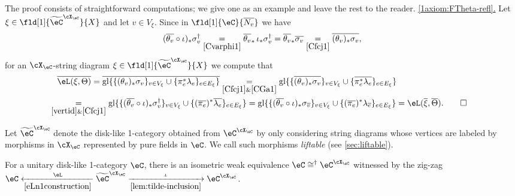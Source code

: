 \documentclass[12pt,reqno]{amsart}
\newcommand{\glu}{\mathrm{gl}}
\newcommand{\C}{\eC}
\newcommand{\tld}[1]{{\widetilde{#1}}}
\newcommand{\fcj}[1]{\overline{#1}}
\newcommand{\orev}{\overline}
\newcommand{\defn}[1]{\emph{#1}}
\newcommand{\itemstep}[1]{\smallskip\noindent\underline{#1}}
\begin{document}
\begin{pf}
The proof consists of straightforward computations; we give one as an example and leave the rest to the reader.
\itemstep{\ref{1axiom:FTheta-refl}.} Let $\xi\in\fld[1]{\tld\C^{\cX_\C}}{X}$ and let $v\in V_\xi$. Since in $\fld[1]{\C}{\orev{N_v}}$ we have
\begin{equation}\label{vertid}
(\orev{\theta_v}\circ\iota)_*\sigma_v^\dag \underset{\ref{Cvarphi1}}{=} \orev{\theta_v}_*\,\iota_*\sigma_v^\dag 
=
\orev{\theta_v}_*\fcj{\sigma_v} 
\underset{\ref{Cfcj1}}{=} 
\fcj{(\theta_v)_*\sigma_v},
\end{equation}
for an $\cX_\C$-string diagram $\xi\in\fld[1]{\tld\C^{\cX_\C}}{X}$ we compute that
\begin{align*}
&\fcj{\eL(\xi,\Theta)}
=
\fcj{\glu\{\{(\theta_v)_*\sigma_v\}_{v\in V_\xi}
\cup
\{\pi_e^*\lambda_e\}_{e\in E_\xi}\}}
\underset{\substack{\ref{Cfcj1}\&\ref{CGa1}}}{=}
\glu\{
\{\fcj{(\theta_v)_*\sigma_v}
\}_{v\in V_\xi}
\cup
\{\fcj{\pi_e^*\lambda_e}\}_{e\in E_\xi}
\}
\\
&\!\!\!\!\!\!\underset{\substack{\eqref{vertid}\&\ref{Cfcj1}}}{=}
\glu\{\{(\orev{\theta_v}\circ\iota)_*\sigma_v^\dag\}_{v\in V_\xi}
\cup
\{(\orev{\pi_e})^*\fcj{\lambda_e}\}_{e\in E_\xi}
\}
=
\glu\{\{(\orev{\theta_v}\circ\iota)_*\sigma_{\orev v}\}_{v\in V_\xi}\cup\{(\orev{\pi_e})^*\lambda_{\orev e}\}_{e\in E_\xi}\}
=
\eL(\fcj\xi,\orev\Theta).\qedhere
\end{align*}
\end{pf}

Let $\widetilde{\eC}^{\cX_\eC}$ denote the disk-like 1-category obtained from $\eC^{\cX_\eC}$ by only considering string diagrams whose vertices are labeled by morphisms in $\cX_\C$ represented by pure fields in $\C$. We call such morphisms \defn{liftable} (see \cref{sec:liftable}). 

\begin{proposition}
\label{prop:CXCcongC}
    For a unitary disk-like 1-category $\eC$, there is an isometric weak equivalence $\eC\cong^\dag\eC^{\cX_\eC}$ witnessed by the zig-zag $\eC\xleftarrow[\eqref{eLn1construction}]{\eL}\widetilde{\eC}^{\cX_\eC}\xrightarrow[\eqref{lem:tilde-inclusion}]{\iota}\eC^{\cX_\eC}$.
\end{proposition}
\end{document}
